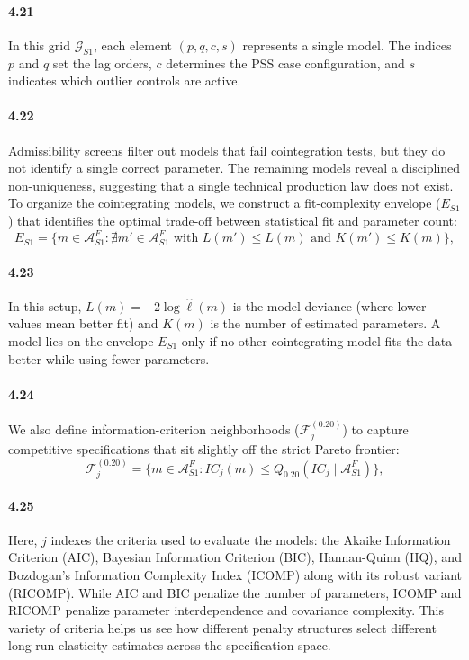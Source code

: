 \paragraph{4.21}
In this grid $\mathcal{G}_{S1}$, each element $(p, q, c, s)$ represents a single model. The indices $p$ and $q$ set the lag orders, $c$ determines the PSS case configuration, and $s$ indicates which outlier controls are active.

\paragraph{4.22}
Admissibility screens filter out models that fail cointegration tests, but they do not identify a single correct parameter. The remaining models reveal a disciplined non-uniqueness, suggesting that a single technical production law does not exist. To organize the cointegrating models, we construct a fit-complexity envelope ($E_{S1}$) that identifies the optimal trade-off between statistical fit and parameter count:
\begin{equation}
E_{S1} = \{ m \in \mathcal{A}^{F}_{S1} : \nexists m' \in \mathcal{A}^{F}_{S1} \text{ with } L(m') \leq L(m) \text{ and } K(m') \leq K(m) \},
\label{eq:E_S1}
\end{equation}

\paragraph{4.23}
In this setup, $L(m) = -2\log\hat{\ell}(m)$ is the model deviance (where lower values mean better fit) and $K(m)$ is the number of estimated parameters. A model lies on the envelope $E_{S1}$ only if no other cointegrating model fits the data better while using fewer parameters.

\paragraph{4.24}
We also define information-criterion neighborhoods ($\mathcal{F}^{(0.20)}_j$) to capture competitive specifications that sit slightly off the strict Pareto frontier:
\begin{equation}
\mathcal{F}^{(0.20)}_j = \{ m \in \mathcal{A}^{F}_{S1} : IC_j(m) \leq Q_{0.20}(IC_j \mid \mathcal{A}^{F}_{S1}) \},
\label{eq:F_j}
\end{equation}

\paragraph{4.25}
Here, $j$ indexes the criteria used to evaluate the models: the Akaike Information Criterion (AIC), Bayesian Information Criterion (BIC), Hannan-Quinn (HQ), and Bozdogan's Information Complexity Index (ICOMP) along with its robust variant (RICOMP). While AIC and BIC penalize the number of parameters, ICOMP and RICOMP penalize parameter interdependence and covariance complexity. This variety of criteria helps us see how different penalty structures select different long-run elasticity estimates across the specification space.

